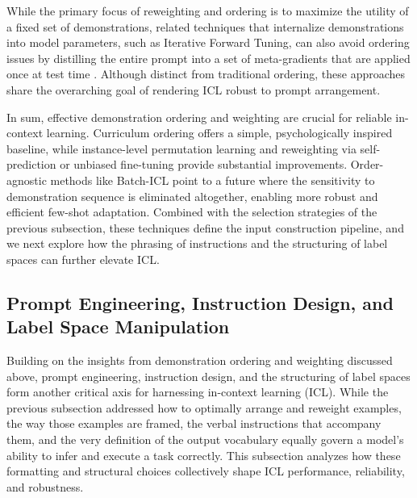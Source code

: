 \documentclass[11pt]{article}
\begin{document}
While the primary focus of reweighting and ordering is to maximize the utility of a fixed set of demonstrations, related techniques that internalize demonstrations into model parameters, such as Iterative Forward Tuning, can also avoid ordering issues by distilling the entire prompt into a set of meta-gradients that are applied once at test time \cite{ref65}. Although distinct from traditional ordering, these approaches share the overarching goal of rendering ICL robust to prompt arrangement.

In sum, effective demonstration ordering and weighting are crucial for reliable in-context learning. Curriculum ordering offers a simple, psychologically inspired baseline, while instance-level permutation learning and reweighting via self-prediction or unbiased fine-tuning provide substantial improvements. Order-agnostic methods like Batch-ICL point to a future where the sensitivity to demonstration sequence is eliminated altogether, enabling more robust and efficient few-shot adaptation. Combined with the selection strategies of the previous subsection, these techniques define the input construction pipeline, and we next explore how the phrasing of instructions and the structuring of label spaces can further elevate ICL.

\subsection{Prompt Engineering, Instruction Design, and Label Space Manipulation}

Building on the insights from demonstration ordering and weighting discussed above, prompt engineering, instruction design, and the structuring of label spaces form another critical axis for harnessing in-context learning (ICL). While the previous subsection addressed how to optimally arrange and reweight examples, the way those examples are framed, the verbal instructions that accompany them, and the very definition of the output vocabulary equally govern a model's ability to infer and execute a task correctly. This subsection analyzes how these formatting and structural choices collectively shape ICL performance, reliability, and robustness.
\end{document}
